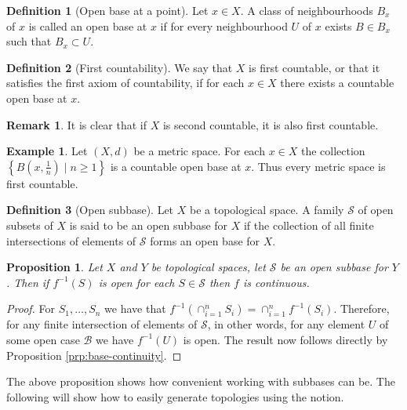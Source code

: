 \documentclass[11pt,a4paper]{article}
\theoremstyle{definition}
\newtheorem{definition}{Definition}[section]
\newtheorem{remark}{Remark}[section]
\newtheorem{example}{Example}[section]
\theoremstyle{plain}
\newtheorem{proposition}[theorem]{Proposition}
\newcommand{\set}[2]{ \left\{ #1 \mid #2 \right\} }
\begin{document}
  \begin{definition}[Open base at a point]
    Let $x \in X$. A class of neighbourhoods $B_x$ of $x$ is called an open
    base at $x$ if for every neighbourhood $U$ of $x$ exists $B \in B_x$
    such that $B_x \subset U$.
  \end{definition}

  \begin{definition}[First countability]
    We say that $X$ is first countable, or that it satisfies the first
    axiom of countability, if for each $x \in X$ there exists a countable 
    open base at $x$.
  \end{definition}

  \begin{remark}
    It is clear that if $X$ is second countable, it is also first countable.
  \end{remark}

  \begin{example}
    Let $(X, d)$ be a metric space. For each $x \in X$ the collection
    $\set{B(x, \frac{1}{n})}{n \geq 1}$ is a countable open base at $x$. 
    Thus every metric space is first countable.
  \end{example}

  \begin{definition}[Open subbase]
    Let $X$ be a topological space. A family $\mathcal{S}$ of open subsets 
    of $X$ is said to be an open subbase for $X$ if the collection of all 
    finite intersections of elements of $\mathcal{S}$ forms an open base 
    for $X$.
  \end{definition}

  \begin{proposition}
    Let $X$ and $Y$ be topological spaces, let $\mathcal{S}$ be an open
    subbase for $Y$. Then if $f^{-1}(S)$ is open for each $S \in \mathcal{S}$
    then $f$ is continuous.
  \end{proposition}
  \begin{proof}
    For $S_1,\dots,S_n$ we have that 
    $f^{-1}(\cap_{i=1}^{n} S_i) = \cap_{i=1}^{n} f^{-1}(S_i)$.
    Therefore, for any finite intersection of elements of $\mathcal S$,
    in other words, for any element $U$ of some open case $\mathcal B$
    we have $f^{-1}(U)$ is open. The result now follows directly by 
    Proposition \ref{prp:base-continuity}.
  \end{proof}

  The above proposition shows how convenient working with subbases can be.
  The following will show how to easily generate topologies using the notion.
\end{document}
